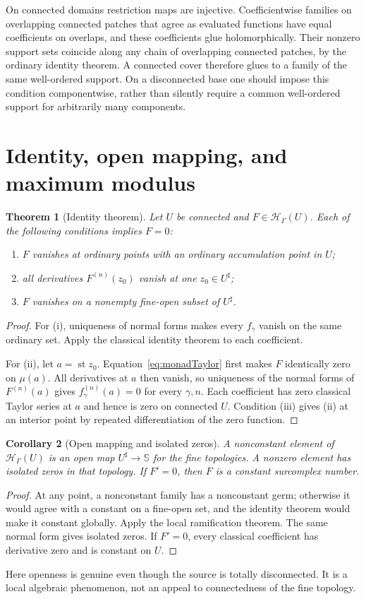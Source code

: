 \documentclass[11pt,a4paper]{article}
\newtheorem{theorem}{Theorem}[section]
\newtheorem{corollary}[theorem]{Corollary}
\theoremstyle{definition}
\theoremstyle{remark}
\newcommand{\SC}{\mathbb S}
\newcommand{\HH}{\mathcal H}
\newcommand{\st}{\operatorname{st}}
\begin{document}
On connected domains restriction maps are injective. Coefficientwise
families on overlapping connected patches that agree as evaluated
functions have equal coefficients on overlaps, and these coefficients
glue holomorphically. Their nonzero support sets coincide along any
chain of overlapping connected patches, by the ordinary identity
theorem. A connected cover therefore glues to a family of the same
well-ordered support. On a disconnected base one should impose this
condition componentwise, rather than silently require a common
well-ordered support for arbitrarily many components.

\section{Identity, open mapping, and maximum modulus}\label{sec:rigidity}
\begin{theorem}[Identity theorem]\label{thm:identity}
Let $U$ be connected and $F\in\HH_\Gamma(U)$. Each of the following
conditions implies $F=0$:
\begin{enumerate}[label=(\roman*)]
\item $F$ vanishes at ordinary points with an ordinary accumulation
point in $U$;
\item all derivatives $F^{(n)}(z_0)$ vanish at one $z_0\in U^\sharp$;
\item $F$ vanishes on a nonempty fine-open subset of $U^\sharp$.
\end{enumerate}
\end{theorem}
\begin{proof}
For (i), uniqueness of normal forms makes every $f_\gamma$ vanish on
the same ordinary set. Apply the classical identity theorem to each
coefficient.

For (ii), let $a=\st z_0$. Equation~\eqref{eq:monadTaylor} first
makes $F$ identically zero on $\mu(a)$. All derivatives at $a$ then
vanish, so uniqueness of the normal forms of $F^{(n)}(a)$ gives
$f_\gamma^{(n)}(a)=0$ for every $\gamma,n$. Each coefficient has
zero classical Taylor series at $a$ and hence is zero on connected
$U$. Condition (iii) gives (ii) at an interior point by repeated
differentiation of the zero function.
\end{proof}

\begin{corollary}[Open mapping and isolated zeros]\label{cor:open}
A nonconstant element of $\HH_\Gamma(U)$ is an open map
$U^\sharp\to\SC$ for the fine topologies. A nonzero element has
isolated zeros in that topology. If $F'=0$, then $F$ is a constant
surcomplex number.
\end{corollary}
\begin{proof}
At any point, a nonconstant family has a nonconstant germ; otherwise
it would agree with a constant on a fine-open set, and the identity
theorem would make it constant globally. Apply the local ramification
theorem. The same normal form gives isolated zeros. If $F'=0$, every
classical coefficient has derivative zero and is constant on $U$.
\end{proof}
Here openness is genuine even though the source is totally
disconnected. It is a local algebraic phenomenon, not an appeal to
connectedness of the fine topology.
\end{document}
